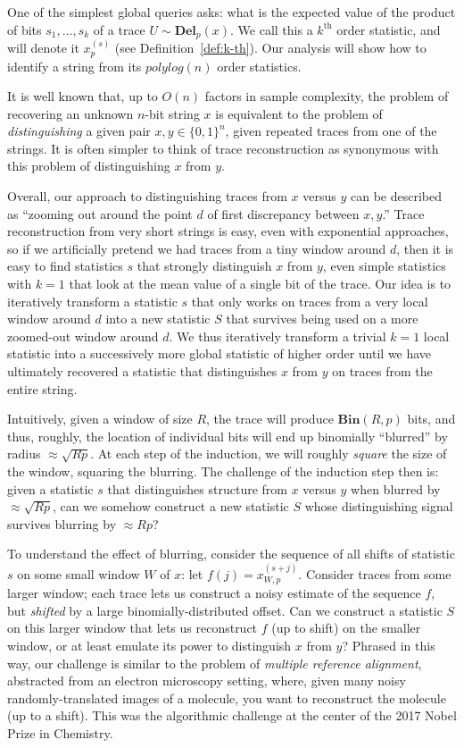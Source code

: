 \documentclass[11pt]{article}
\theoremstyle{plain}
\newcommand{\Del}[2]{\textbf{Del}_{#1}(#2)}
\newcommand{\Bin}[2]{\textbf{Bin}(#1,#2)}
\begin{document}
One of the simplest global queries asks: what is the expected value of the product of bits $s_1,\ldots,s_k$ of a trace $U\sim \Del{p}{x}$. We call this a $k^\textrm{th}$ order statistic, and will denote it $x_p^{(s)}$ (see Definition~\ref{def:k-th}). Our analysis will show how to identify a string from its $polylog(n)$ order statistics.

It is well known that, up to $O(n)$ factors in sample complexity, the problem of recovering an unknown $n$-bit string $x$ is equivalent to the problem of \emph{distinguishing} a given pair $x,y\in\{0,1\}^n$, given repeated traces from one of the strings. It is often simpler to think of trace reconstruction as synonymous with this problem of distinguishing $x$ from $y$.

Overall, our approach to distinguishing traces from $x$ versus $y$ can be described as ``zooming out around the point $d$ of first discrepancy between $x,y$.'' Trace reconstruction from very short strings is easy, even with exponential approaches, so if we artificially pretend we had traces from a tiny window around $d$, then it is easy to find statistics $s$ that strongly distinguish $x$ from $y$, even simple statistics with $k=1$ that look at the mean value of a single bit of the trace.
Our idea is to iteratively transform a statistic $s$ that only works on traces from a very local window around $d$ into a new statistic $S$ that survives being used on a more zoomed-out window around $d$. We thus iteratively transform a trivial $k=1$ local statistic into a successively more global statistic of higher order until we have ultimately recovered a statistic that distinguishes $x$ from $y$ on traces from the entire string.

Intuitively, given a window of size $R$, the trace will produce $\Bin{R}{p}$ bits, and thus, roughly, the location of individual bits will end up binomially ``blurred'' by radius $\approx\sqrt{Rp}$. At each step of the induction, we will roughly \emph{square} the size of the window, squaring the blurring. The challenge of the induction step then is: given a statistic $s$ that distinguishes structure from $x$ versus $y$ when blurred by $\approx\sqrt{Rp}$, can we somehow construct a new statistic $S$ whose distinguishing signal survives blurring by $\approx Rp$? 

To understand the effect of blurring, consider the sequence of all shifts of statistic $s$ on some small window $W$ of $x$: let $f(j)=x^{(s+j)}_{W,p}$. Consider traces from some larger window; each trace lets us construct a noisy estimate of the sequence $f$, but \emph{shifted} by a large binomially-distributed offset. Can we construct a statistic $S$ on this larger window that lets us reconstruct $f$ (up to shift) on the smaller window, or at least emulate its power to distinguish $x$ from $y$? Phrased in this way, our challenge is similar to the problem of \emph{multiple reference alignment}, abstracted from an electron microscopy setting, where, given many noisy randomly-translated images of a molecule, you want to reconstruct the molecule (up to a shift). This was the algorithmic challenge at the center of the 2017 Nobel Prize in Chemistry.
\end{document}
